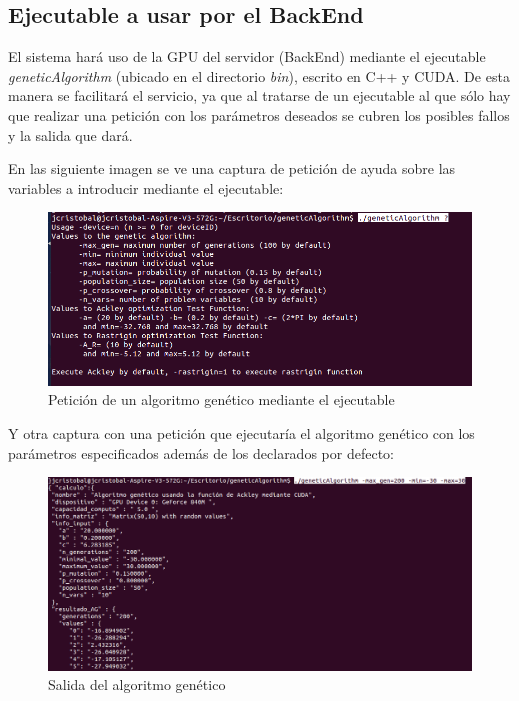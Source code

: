 \bigskip
\subsection{Ejecutable a usar por el BackEnd}
\bigskip

El sistema hará uso de la GPU del servidor (BackEnd) mediante el ejecutable \textit{geneticAlgorithm} (ubicado en el directorio \textit{bin}), escrito en C++ y CUDA. De esta manera se facilitará el servicio, ya que al tratarse de un ejecutable al que sólo hay que realizar una petición con los parámetros deseados se cubren los posibles fallos y la salida que dará. 

En las siguiente imagen se ve una captura de petición de ayuda sobre las variables a introducir mediante el ejecutable:

\bigskip
\begin{figure}[h]
	\centering
	\includegraphics[width=1\linewidth]{../images/peticion_ejecutable}
	\caption[Petición de un algoritmo genético mediante el ejecutable]{Petición de un algoritmo genético mediante el ejecutable}
	\label{fig:peticion_ejecutable}
\end{figure}

\bigskip
Y otra captura con una petición que ejecutaría el algoritmo genético con los parámetros especificados además de los declarados por defecto:

\bigskip
\begin{figure}[h]
	\centering
	\includegraphics[width=1\linewidth]{../images/salida_ejecutable}
	\caption[Salida del algoritmo genético]{Salida del algoritmo genético}
	\label{fig:salida_ejecutable}
\end{figure}

